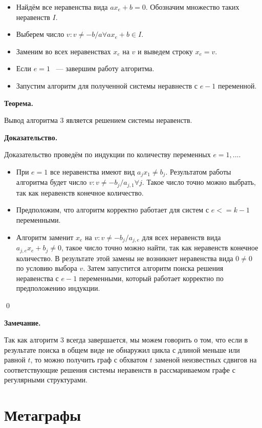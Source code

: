 \documentclass[14pt]{mmcs-article}
\begin{document}
\begin{itemize}
    \item Найдём все неравенства  вида $a x_e + b = 0$. Обозначим множество таких неравенств $I$.
    \item Выберем число $v: v \neq -b/a \forall a x_e + b \in I$.
    \item Заменим во всех неравенствах $x_e$ на $v$ и выведем строку $x_e = v$.
    \item Если $e = 1$ ~--- завершим работу алгоритма.
    \item Запустим алгоритм для полученной системы неравнеств с $e - 1$ переменной.
\end{itemize}

\textbf{Теорема.}

Вывод алгоритма 3 является решением системы неравенств.

\textbf{Доказательство.}

Доказательство проведём по индукции по количеству переменных $e = 1, ...$.

\begin{itemize}
\item При $e = 1$ все неравенства имеют вид $a_j x_1 \neq b_j$. Результатом работы алгоритма будет число $v: v \neq -b_{j}/a_{j, 1} \forall j$. Такое число точно можно выбрать, так как неравенств конечное количество.
\item Предположим, что алгоритм корректно работает для систем с $e <= k - 1$ переменными.
\item Алгоритм заменит $x_e$ на $v: v \neq -b_{j}/a_{j, e}$ для всех неравенств вида $a_{j, e} x_e + b_j \neq 0$, такое число точно можно найти, так как неравенств конечное количество. В результате этой замены не возникнет неравенства вида $0 \neq 0$ по условию выбора $v$. Затем запустится алгоритм поиска решения неравенства с $e - 1$ переменными, который работает корректно по предположению индукции. 
\end{itemize}

\qed

\textbf{Замечание.}

Так как алгоритм 3 всегда завершается, мы можем говорить о том, что если в результате поиска в общем виде не обнаружил цикла с длиной меньше или равной $t$, то можно получить граф с обхватом $t$ заменой неизвестных сдвигов на соответствующие решения системы неравенств в рассмариваемом графе с регулярными структурами.

\section{Метаграфы}
\end{document}
